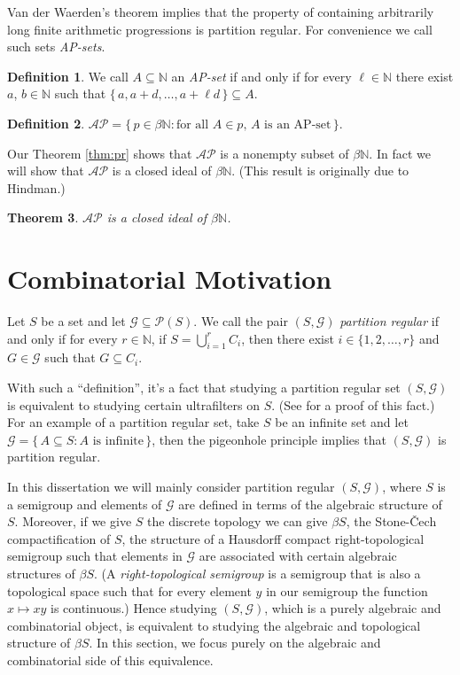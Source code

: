 \documentclass[12pt]{article}
\theoremstyle{plain}
\newtheorem{thm}{Theorem}[section]
\theoremstyle{definition}
\newtheorem{defn}[thm]{Definition}
\newcommand{\bbN}{\mathbb{N}}
\newcommand{\AP}{\mathcal{AP}}
\newcommand{\calG}{\mathcal{G}}
\newcommand{\calP}{\mathcal{P}}
\begin{document}
Van der Waerden's theorem implies that the property of containing
arbitrarily long finite arithmetic progressions is partition regular. 
For convenience we call such sets \textsl{AP-sets}.

\begin{defn}
  We call $A \subseteq \bbN$ an \textsl{AP-set} if and only if for
  every $\ell \in \bbN$ there exist $a$, $b \in \bbN$ such that $\{\,
  a, a+d, \ldots, a+\ell d\,\} \subseteq A$.
\end{defn}

\begin{defn}
  $\AP = \{\, p \in \beta \bbN : \mbox{for all $A \in p$, $A$ is an
    AP-set} \,\}$. 
\end{defn}

Our Theorem \ref{thm:pr} shows that $\AP$ is a nonempty subset of
$\beta\bbN$. 
In fact we will show that $\AP$ is a closed ideal of $\beta\bbN$. 
(This result is originally due to Hindman.)
\begin{thm}
  $\AP$ is a closed ideal of $\beta\bbN$.
\end{thm}

\section{Combinatorial Motivation} 
Let $S$ be a set and let $\calG \subseteq \calP(S)$.
We call the pair $(S, \calG)$ \textsl{partition regular} if and only
if for every $r \in \bbN$, if $S = \bigcup_{i=1}^r C_i$, then there
exist $i \in \{1, 2, \ldots, r\}$ and $G \in \calG$ such that $G
\subseteq C_i$. 

With such a ``definition'', it's a fact that studying a partition
regular set $(S, \calG)$ is equivalent to studying certain ultrafilters on
$S$. 
(See \cite[Theorem 5.7]{Hindman:1998fk} for a proof of this fact.)
For an example of a partition regular set, take $S$ be an infinite set
and let $\calG = \{\, A \subseteq S : \mbox{$A$ is infinite} \,\}$, then the
pigeonhole principle implies that $(S, \calG)$ is partition regular.

In this dissertation we will mainly consider partition regular $(S,
\calG)$, where $S$ is a semigroup and elements of $\calG$ are defined
in terms of the algebraic structure of $S$.
Moreover, if we give $S$ the discrete topology we can give $\beta S$,
the Stone-\v{C}ech compactification of $S$, the structure of a Hausdorff
compact right-topological semigroup 
such that elements in $\calG$ are associated with certain algebraic
structures of $\beta S$. 
(A \textsl{right-topological semigroup} is a semigroup that is also a
topological space such that for every element $y$ in our semigroup the
function $x \mapsto xy$ is continuous.)
Hence studying $(S, \calG)$, which is a purely algebraic and
combinatorial object, is equivalent to studying the algebraic and
topological structure of $\beta S$. 
In this section, we focus purely on the algebraic and combinatorial
side of this equivalence.
\end{document}
